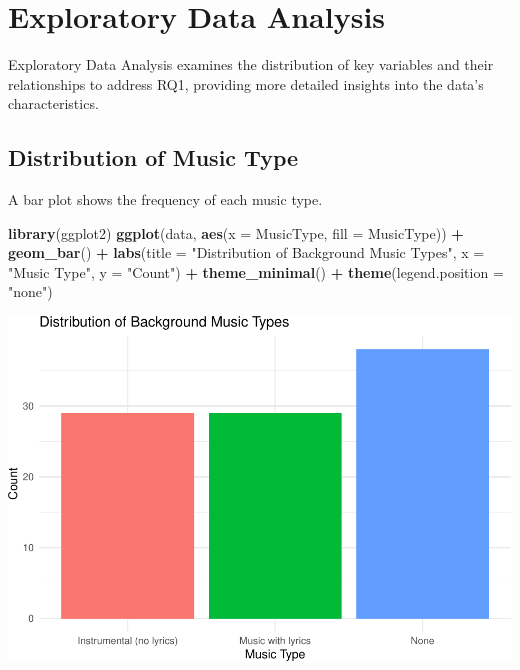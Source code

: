 \documentclass[
]{article}
\newenvironment{Shaded}{\begin{snugshade}}{\end{snugshade}}
\newcommand{\AttributeTok}[1]{\textcolor[rgb]{0.13,0.29,0.53}{#1}}
\newcommand{\FunctionTok}[1]{\textcolor[rgb]{0.13,0.29,0.53}{\textbf{#1}}}
\newcommand{\NormalTok}[1]{#1}
\newcommand{\SpecialCharTok}[1]{\textcolor[rgb]{0.81,0.36,0.00}{\textbf{#1}}}
\newcommand{\StringTok}[1]{\textcolor[rgb]{0.31,0.60,0.02}{#1}}
\begin{document}
\section{Exploratory Data Analysis}\label{exploratory-data-analysis}

Exploratory Data Analysis examines the distribution of key variables and
their relationships to address RQ1, providing more detailed insights
into the data's characteristics.

\subsection{Distribution of Music
Type}\label{distribution-of-music-type}

A bar plot shows the frequency of each music type.

\begin{Shaded}
\begin{Highlighting}[]
\FunctionTok{library}\NormalTok{(ggplot2)}
\FunctionTok{ggplot}\NormalTok{(data, }\FunctionTok{aes}\NormalTok{(}\AttributeTok{x =}\NormalTok{ MusicType, }\AttributeTok{fill =}\NormalTok{ MusicType)) }\SpecialCharTok{+}
  \FunctionTok{geom\_bar}\NormalTok{() }\SpecialCharTok{+}
  \FunctionTok{labs}\NormalTok{(}\AttributeTok{title =} \StringTok{"Distribution of Background Music Types"}\NormalTok{,}
       \AttributeTok{x =} \StringTok{"Music Type"}\NormalTok{,}
       \AttributeTok{y =} \StringTok{"Count"}\NormalTok{) }\SpecialCharTok{+}
  \FunctionTok{theme\_minimal}\NormalTok{() }\SpecialCharTok{+}
  \FunctionTok{theme}\NormalTok{(}\AttributeTok{legend.position =} \StringTok{"none"}\NormalTok{)}
\end{Highlighting}
\end{Shaded}

\includegraphics{Assignment2_files/figure-latex/unnamed-chunk-1-1.pdf}
\end{document}
